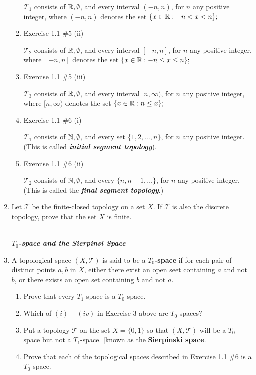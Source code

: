 \documentclass[10pt,a4paper]{report}
\newcommand{\SPECIAL}[1]{\begin{center}
	{\Large \textbf{\textit{\\#1}} }
\end{center}
}
\newcommand{\TT}{\mathcal{T}}
\begin{document}
\begin{enumerate}
\begin{enumerate}[label=(\roman*)]
	$\TT_1$ consists of $\mathbb{R}, \emptyset$, and every interval $(-n,n)$, for $n$ any positive integer, where $(-n,n)$ denotes the set $\{x \in\mathbb{R}:-n<x<n\};$
	
	\item Exercise 1.1 \#5 (ii)
	
	$\TT_2$ consists of $\mathbb{R}, \emptyset$, and every interval $[-n,n]$, for $n$ any positive integer, where $[-n,n]$ denotes the set $\{x \in\mathbb{R}:-n\le x\le n\};$
	
	\item Exercise 1.1 \#5 (iii)
	
	$\TT_3$ consists of $\mathbb{R}, \emptyset$, and every interval $[n,\infty)$, for $n$ any positive integer, where $[n,\infty)$ denotes the set $\{x \in\mathbb{R}:n\le x\};$
	
	\item Exercise 1.1 \#6 (i)
	
	$\TT_1$ consists of $\mathbb{N}, \emptyset$, and every set $\{1,2,\dots,n\}$, for $n$ any positive integer. (This is called \textbf{\textit{initial segment topology}}).
	
	\item Exercise 1.1 \#6 (ii)
	
	$\TT_2$ consists of $\mathbb{N},\emptyset$, and every $\{n, n+1, \dots\}$, for $n$ any positive integer. (This is called the \textbf{\textit{final segment topology}}.)
	
\end{enumerate}

\item Let $\TT$ be the finite-closed topology on a set $X$.  If $\TT$ is also the discrete topology, prove that the set $X$ is finite.

\SPECIAL{$T_0$-space and the Sierpinsi Space}

\item A topological space $(X,\TT)$ is said to be a \textbf{$T_0$-space} if for each pair of distinct points $a,b$ in $X$, either there exist an open seet containing $a$ and not $b$, or there exists an open set containing $b$ and not $a$.

\begin{enumerate}[label=(\roman*)]
	\item Prove that every $T_1$-space is a $T_0$-space.
	\item Which of $(i)-(iv)$ in Exercise 3 above are $T_0$-spaces?
	\item Put a topology $\TT$ on the set $X=\{0,1\}$ so that $(X,\TT)$ will be a $T_0$-space but not a $T_1$-space. [known as the \textbf{Sierpinski space}.]
	\item Prove that each of the topological spaces described in Exercise 1.1 \#6 is a $T_0$-space.
\end{enumerate}


\end{enumerate}
\end{document}
